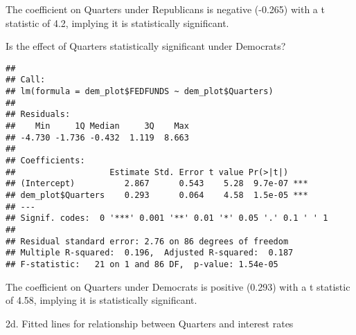 \documentclass[]{article}
\newenvironment{Shaded}{\begin{snugshade}}{\end{snugshade}}
\newcommand{\KeywordTok}[1]{\textcolor[rgb]{0.13,0.29,0.53}{\textbf{#1}}}
\newcommand{\StringTok}[1]{\textcolor[rgb]{0.31,0.60,0.02}{#1}}
\newcommand{\OperatorTok}[1]{\textcolor[rgb]{0.81,0.36,0.00}{\textbf{#1}}}
\newcommand{\NormalTok}[1]{#1}
\begin{document}
The coefficient on Quarters under Republicans is negative (-0.265) with
a t statistic of 4.2, implying it is statistically significant.

Is the effect of Quarters statistically significant under Democrats?

\begin{Shaded}
\end{Shaded}

\begin{verbatim}
## 
## Call:
## lm(formula = dem_plot$FEDFUNDS ~ dem_plot$Quarters)
## 
## Residuals:
##    Min     1Q Median     3Q    Max 
## -4.730 -1.736 -0.432  1.119  8.663 
## 
## Coefficients:
##                   Estimate Std. Error t value Pr(>|t|)    
## (Intercept)          2.867      0.543    5.28  9.7e-07 ***
## dem_plot$Quarters    0.293      0.064    4.58  1.5e-05 ***
## ---
## Signif. codes:  0 '***' 0.001 '**' 0.01 '*' 0.05 '.' 0.1 ' ' 1
## 
## Residual standard error: 2.76 on 86 degrees of freedom
## Multiple R-squared:  0.196,  Adjusted R-squared:  0.187 
## F-statistic:   21 on 1 and 86 DF,  p-value: 1.54e-05
\end{verbatim}

The coefficient on Quarters under Democrats is positive (0.293) with a t
statistic of 4.58, implying it is statistically significant.

2d. Fitted lines for relationship between Quarters and interest rates
\end{document}
